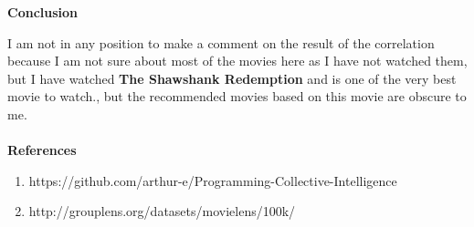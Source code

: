 \documentclass{article}
\begin{document}
\newpage
	
\textbf{Conclusion} 

I am not in any position to make a comment on the result of the correlation because  I am not sure about most of the movies here as I have not watched them, but I have watched 
\textbf{The Shawshank Redemption} and is one of the very best movie to watch., but the recommended movies based on this movie are obscure to me. \\\\
	

\newpage
\textbf{References}
\begin{enumerate}
\item\textbf{} https://github.com/arthur-e/Programming-Collective-Intelligence
\item\textbf{} http://grouplens.org/datasets/movielens/100k/
\end{enumerate}
\end{document}

